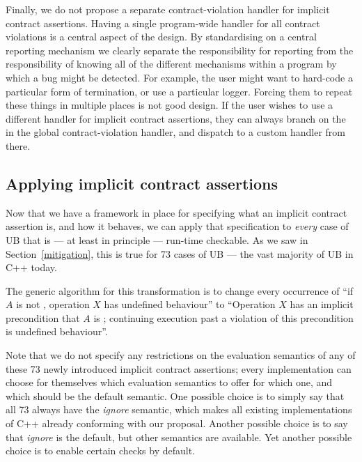 Finally, we do not propose a separate contract-violation handler for implicit contract assertions. Having a single program-wide handler for all contract violations is a central aspect of the \cite{P2900R14} design. By standardising on a central reporting mechanism we clearly separate the responsibility for reporting from the responsibility of knowing all of the different mechanisms within a program by which a bug might be detected. For example, the user might want to hard-code a particular form of termination, or use a particular logger. Forcing them to repeat these things in multiple places is not good design. If the user  wishes to use a different handler for implicit contract assertions, they can always branch on the  in the global contract-violation handler, and dispatch to a custom handler from there.

\subsection{Applying implicit contract assertions}
\label{applyicas}

Now that we have a framework in place for specifying what an implicit contract assertion is, and how it behaves, we can apply that specification to  \emph{every} case of UB  that is --- at least in principle --- run-time checkable. As we saw in Section~\ref{mitigation}, this is true for 73 cases of UB --- the vast majority of UB in C++ today.

The generic algorithm for this transformation is to change every occurrence of “if $A$ is not , operation $X$ has undefined behaviour'' to ``Operation $X$ has an implicit precondition that $A$ is ; continuing execution past a violation of this precondition is undefined behaviour''.

Note that we do not specify any restrictions on the evaluation semantics of any of these 73 newly introduced  implicit contract assertions; every implementation can choose for themselves which evaluation semantics to offer for which one, and which should be the default semantic. One possible choice is to simply say that all 73 always have the \emph{ignore} semantic, which makes all existing implementations of C++ already conforming with our proposal. Another possible choice is to say that  \emph{ignore} is the default, but other semantics are available. Yet another possible choice is to enable certain checks by default.

